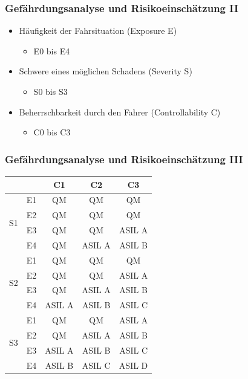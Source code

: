 \documentclass[]{beamer}
\begin{document}
\begin{frame}
\frametitle{Gefährdungsanalyse und Risikoeinschätzung II}

\begin{itemize}
    \item Häufigkeit der Fahrsituation (Exposure E)
    \begin{itemize}
        \item E0 bis E4
    \end{itemize}
    \item Schwere eines möglichen Schadens (Severity S)
    \begin{itemize}
        \item S0 bis S3
    \end{itemize}
    \item Beherrschbarkeit durch den Fahrer (Controllability C)
    \begin{itemize}
        \item C0 bis C3
    \end{itemize}
\end{itemize}

\end{frame}


\begin{frame}
\frametitle{Gefährdungsanalyse und Risikoeinschätzung III}

\center
{
\small
\begin{tabular}[h]{c c | c c c}

\toprule
 &  & C1 & C2 & C3\\
\midrule
\multirow{4}{*}{S1} & E1 & QM & QM & QM\\
 & E2 & QM & QM & QM\\
 & E3 & QM & QM & ASIL A\\
 & E4 & QM & ASIL A & ASIL B\\
\midrule
\multirow{4}{*}{S2} & E1 & QM & QM & QM\\
 & E2 & QM & QM & ASIL A\\
 & E3 & QM & ASIL A & ASIL B\\
 & E4 & ASIL A & ASIL B & ASIL C\\
\midrule
\multirow{4}{*}{S3} & E1 & QM & QM & ASIL A\\
 & E2 & QM & ASIL A & ASIL B\\
 & E3 & ASIL A & ASIL B & ASIL C\\
 & E4 & ASIL B & ASIL C & ASIL D\\
\bottomrule
\end{tabular}
}

\end{frame}
\end{document}
